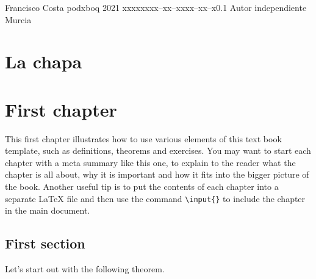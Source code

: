 \documentclass{tstextbook}
\begin{document}
    {Francisco Costa}
    {podxboq}
    {2021}
    {xxxxx}{xxx--xx--xxxx--xx--x}{0.1}
    {Autor independiente}
    {Murcia}

    \printglossaries

    \chapter{La chapa}\label{ch:la-chapa}
    

    \chapter{First chapter}

    \begin{summary}
        This first chapter illustrates how to use various elements of this
        text book template, such as definitions, theorems and exercises. You
        may want to start each chapter with a meta summary like this one, to
        explain to the reader what the chapter is all about, why it is
        important and how it fits into the bigger picture of the
        book. Another useful tip is to put the contents of each chapter into
        a separate \LaTeX{} file and then use the command
        \texttt{\textbackslash{}input\{\}} to include the chapter in the
        main document.
    \end{summary}


    \section{First section}

    Let's start out with the following theorem.
\end{document}
